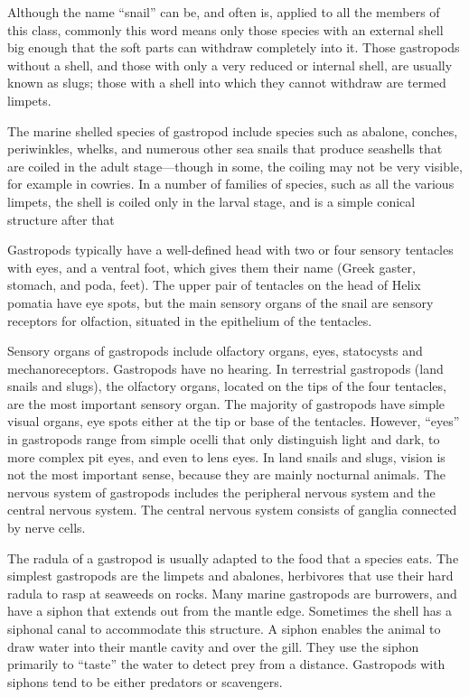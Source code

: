 \documentclass[]{book}
\theoremstyle{definition}
\theoremstyle{definition}
\theoremstyle{definition}
\theoremstyle{remark}
\begin{document}
Although the name ``snail'' can be, and often is, applied to all the
members of this class, commonly this word means only those species with
an external shell big enough that the soft parts can withdraw completely
into it. Those gastropods without a shell, and those with only a very
reduced or internal shell, are usually known as slugs; those with a
shell into which they cannot withdraw are termed limpets.

The marine shelled species of gastropod include species such as abalone,
conches, periwinkles, whelks, and numerous other sea snails that produce
seashells that are coiled in the adult stage---though in some, the
coiling may not be very visible, for example in cowries. In a number of
families of species, such as all the various limpets, the shell is
coiled only in the larval stage, and is a simple conical structure after
that

Gastropods typically have a well-defined head with two or four sensory
tentacles with eyes, and a ventral foot, which gives them their name
(Greek gaster, stomach, and poda, feet). The upper pair of tentacles on
the head of Helix pomatia have eye spots, but the main sensory organs of
the snail are sensory receptors for olfaction, situated in the
epithelium of the tentacles.

Sensory organs of gastropods include olfactory organs, eyes, statocysts
and mechanoreceptors. Gastropods have no hearing. In terrestrial
gastropods (land snails and slugs), the olfactory organs, located on the
tips of the four tentacles, are the most important sensory organ. The
majority of gastropods have simple visual organs, eye spots either at
the tip or base of the tentacles. However, ``eyes'' in gastropods range
from simple ocelli that only distinguish light and dark, to more complex
pit eyes, and even to lens eyes. In land snails and slugs, vision is not
the most important sense, because they are mainly nocturnal animals. The
nervous system of gastropods includes the peripheral nervous system and
the central nervous system. The central nervous system consists of
ganglia connected by nerve cells.

The radula of a gastropod is usually adapted to the food that a species
eats. The simplest gastropods are the limpets and abalones, herbivores
that use their hard radula to rasp at seaweeds on rocks. Many marine
gastropods are burrowers, and have a siphon that extends out from the
mantle edge. Sometimes the shell has a siphonal canal to accommodate
this structure. A siphon enables the animal to draw water into their
mantle cavity and over the gill. They use the siphon primarily to
``taste'' the water to detect prey from a distance. Gastropods with
siphons tend to be either predators or scavengers.
\end{document}
